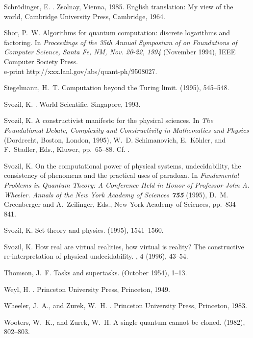 \begin{thebibliography}{10}
{\sc Schr{\"{o}}dinger, E.}
.
\newblock Zsolnay, Vienna, 1985.
\newblock English translation: My view of the world, Cambridge University
  Press, Cambridge, 1964.

{\sc Shor, P.~W.}
\newblock Algorithms for quantum computation: discrete logarithms and
  factoring.
\newblock In {\em Proceedings of the 35th Annual Symposium of on Foundations of
  Computer Science, Santa Fe, NM, Nov. 20-22, 1994\/} (November 1994), IEEE
  Computer Society Press.
\newblock \\e-print http://xxx.lanl.gov/abs/quant-ph/9508027.

{\sc Siegelmann, H.~T.}
\newblock Computation beyond the {T}uring limit.
 (1995), 545--548.

{\sc Svozil, K.}
.
\newblock World Scientific, Singapore, 1993.

{\sc Svozil, K.}
\newblock A constructivist manifesto for the physical sciences.
\newblock In {\em The Foundational Debate, Complexity and Constructivity in
  Mathematics and Physics\/} (Dordrecht, Boston, London, 1995), W.~D.
  Schimanovich, E.~K{\"{o}}hler, and F.~Stadler, Eds., Kluwer, pp.~65--88.
\newblock Cf. \cite{svozil-complexity:95}.

{\sc Svozil, K.}
\newblock On the computational power of physical systems, undecidability, the
  consistency of phenomena and the practical uses of paradoxa.
\newblock In {\em Fundamental Problems in Quantum Theory: A Conference Held in
  Honor of Professor John A. Wheeler. Annals of the New York Academy of
  Sciences {\bf 755}\/} (1995), D.~M. Greenberger and A.~Zeilinger, Eds., New
  York Academy of Sciences, pp.~834--841.

{\sc Svozil, K.}
\newblock Set theory and physics.
 (1995), 1541--1560.

{\sc Svozil, K.}
\newblock How real are virtual realities, how virtual is reality? {T}he
  constructive re-interpretation of physical undecidability.
, 4 (1996), 43--54.

{\sc Thomson, J.~F.}
\newblock Tasks and supertasks.
 (October 1954), 1--13.

{\sc Weyl, H.}
.
\newblock Princeton University Press, Princeton, 1949.

{\sc Wheeler, J.~A., and Zurek, W.~H.}
.
\newblock Princeton University Press, Princeton, 1983.

{\sc Wooters, W.~K., and Zurek, W.~H.}
\newblock A single quantum cannot be cloned.
 (1982), 802--803.

\end{thebibliography}

